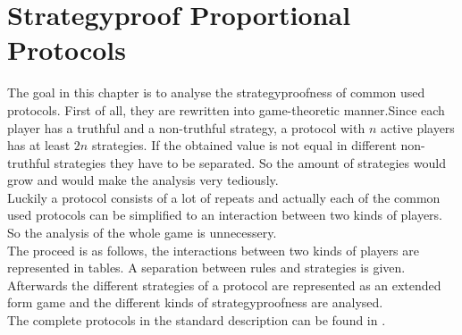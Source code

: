 \section{Strategyproof Proportional Protocols}
The goal in this chapter is to analyse the strategyproofness of common used protocols. First of all, they are rewritten into game-theoretic manner.Since each player has a truthful and a non-truthful strategy, a protocol with $n$ active players has at least $2n$ strategies. If the obtained value is not equal in different non-truthful strategies they have to be separated. So the amount of strategies would grow and would make the analysis very tediously.\\Luckily a protocol consists of a lot of repeats and actually each of the common used protocols can be simplified to an interaction between two kinds of players. So the analysis of the whole game is unnecessery.\\
The proceed is as follows, the interactions between two kinds of players are represented in tables. A separation between rules and strategies is given. Afterwards the different strategies of a protocol are represented as an extended form game and the different kinds of strategyproofness are analysed.
\\The complete protocols in the standard description can be found in \cite{robertson:cake-cutting}.

